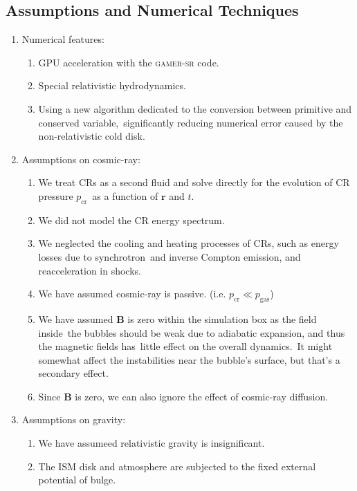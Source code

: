 \documentclass[twocolumn]{aastex631}
\begin{document}
\subsection{Assumptions and Numerical Techniques}
\begin{enumerate}
  \item Numerical features:
    \begin{enumerate}
      \item GPU acceleration with the \textsc{gamer-sr} code.
      \item Special relativistic hydrodynamics.
      \item Using a new algorithm dedicated to the conversion between primitive and conserved variable,\
            significantly reducing numerical error caused by the non-relativistic cold disk.
    \end{enumerate}
  \item Assumptions on cosmic-ray:
    \begin{enumerate}
      \item We treat CRs as a second fluid and solve directly for the evolution of CR pressure $p_{\text{cr}}$\
            as a function of $\mathbf{r}$ and $t$.
      \item We did not model the CR energy spectrum.
      \item We neglected the cooling and heating processes of CRs, such as energy losses due to synchrotron\
            and inverse Compton emission, and reacceleration in shocks.
      \item We have assumed cosmic-ray is passive. (i.e. $p_{\text{cr}}\ll p_{\text{gas}}$)
      \item We have assumed $\mathbf{B}$ is zero within the simulation box as the field inside\
            the bubbles should be weak due to adiabatic expansion, and thus the magnetic fields has\
            little effect on the overall dynamics.\
            It might somewhat affect the instabilities near the bubble's surface, but that's a secondary effect.
      \item Since $\mathbf{B}$ is zero, we can also ignore the effect of cosmic-ray diffusion.
    \end{enumerate}
  \item Assumptions on gravity:
    \begin{enumerate}
      \item We have assumeed relativistic gravity is insignificant.
      \item The ISM disk and atmosphere are subjected to the fixed external potential of bulge.

\end{enumerate}
\end{enumerate}
\end{document}
